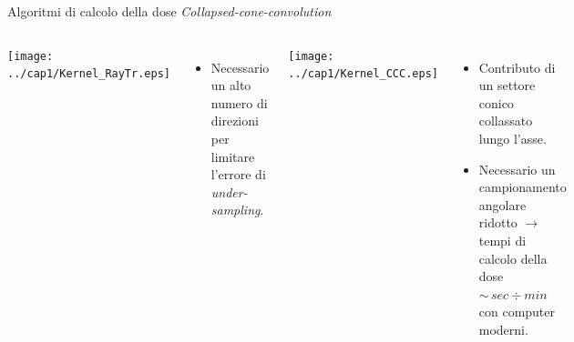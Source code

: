 \documentclass{beamer}
\begin{document}
\begin{frame}{Algoritmi di calcolo della dose}
\small
\centering
\alert{\textit{Collapsed-cone-convolution}}\\\vspace{.3cm}
\begin{columns}[t]
\centering
\texttt{[image: ../cap1/Kernel\_RayTr.eps]}\\\vspace{.5cm}
\scriptsize
{}
\begin{itemize}
\scriptsize
\item Necessario un alto numero di direzioni per limitare l'errore di \textit{under-sampling}.
\end{itemize}

\centering
\texttt{[image: ../cap1/Kernel\_CCC.eps]}\\\vspace{.5cm}
\scriptsize
{}
\begin{itemize}
\scriptsize
\item Contributo di un settore conico collassato lungo l'asse.
\item Necessario un campionamento angolare ridotto $\rightarrow$ tempi di calcolo della dose $\sim\,sec \div min$ con computer moderni.
\end{itemize}
\end{columns}
\end{frame}
\end{document}
